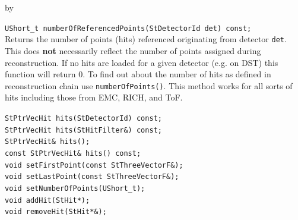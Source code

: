 \documentclass[twoside]{article}
\newcommand{\entrylabel}[1]{\mbox{\textbf{{#1}}}\hfil}%
\newenvironment{entry}
{\begin{list}{}%
    {\renewcommand{\makelabel}{\entrylabel}%
     \setlength{\labelwidth}{90pt}%
     \setlength{\leftmargin}{\labelwidth}
     \advance\leftmargin by \labelsep%
      }%
    }%
  {\end{list}}
\newcommand{\Entrylabel}[1]%
{\raisebox{0pt}[1ex][0pt]{\makebox[\labelwidth][l]%
    {\parbox[t]{\labelwidth}{\hspace{0pt}\textbf{{#1}}}}}}
\newenvironment{Entry}%
{\renewcommand{\entrylabel}{\Entrylabel}\begin{entry}}%
  {\end{entry}}
\begin{document}
\begin{Entry}
    \verb+UShort_t numberOfReferencedPoints(StDetectorId det) const;+\\
    Returns the number of points (hits) referenced originating from
    detector \texttt{det}. This does \textbf{not} necessarily reflect
    the number of points assigned during reconstruction. If no hits
    are loaded for a given detector (e.g. on DST) this function will
    return 0. To find out about the number of hits as defined in
    reconstruction chain use \texttt{numberOfPoints()}.
    This method works for all sorts of hits including those from EMC, RICH, and ToF.

    
    \verb+StPtrVecHit hits(StDetectorId) const;+\\
    \verb+StPtrVecHit hits(StHitFilter&) const;+\\
    \verb+StPtrVecHit& hits();+\\
    \verb+const StPtrVecHit& hits() const;+\\
    \verb+void setFirstPoint(const StThreeVectorF&);+\\
    \verb+void setLastPoint(const StThreeVectorF&);+\\
    \verb+void setNumberOfPoints(UShort_t);+\\
    \verb+void addHit(StHit*);+\\
    \verb+void removeHit(StHit*&);+\\
\end{Entry}
\clearpage
\end{document}
